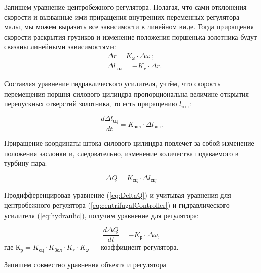 Запишем уравнение центробежного регулятора. Полагая, что сами отклонения скорости и вызванные ими приращения внутренних переменных регулятора малы, мы можем выразить все зависимости в линейном виде. Тогда приращения скорости раскрытия грузиков и изменение положения поршенька золотника будут связаны линейными зависимостями: 
\begin{align}\label{eq:centrifugalController}
	&\Delta  r=K_{\omega}\cdot\Delta \omega~;\\\nonumber
	&\Delta  l_{зол}=-K_{r}\cdot\Delta  r.
\end{align}

Составляя уравнение гидравлического усилителя, учтём, что скорость перемещения поршня силового цилиндра пропорциональна величине открытия перепускных отверстий золотника, то есть приращению $ l_{зол} $:

\begin{equation}\label{eq:hydraulic}
	\frac{d\Delta  l_{сц}}{dt}=K_{зол}\cdot\Delta  l_{зол}.
\end{equation}

Приращение координаты штока силового цилиндра повлечет за собой изменение положения заслонки и, следовательно, изменение количества подаваемого в турбину пара:	

\begin{equation}\label{eq:DeltaQ}
	\Delta  Q=K_{сц}\cdot\Delta  l_{сц}.
\end{equation}

Продифференцировав уравнение (\ref{eq:DeltaQ}) и учитывая уравнения для центробежного регулятора (\ref{eq:centrifugalController}) и гидравлического усилителя (\ref{eq:hydraulic}), получим уравнение для регулятора:

\begin{equation}
	\frac{d\Delta  Q}{dt}=-K_{р}\cdot\Delta \omega,
\end{equation}
где $ К_{р}=K_{сц}\cdot K_{Зол}\cdot K_{r}\cdot K_{\omega} $ --- коэффициент регулятора.

Запишем совместно уравнения объекта и регулятора

